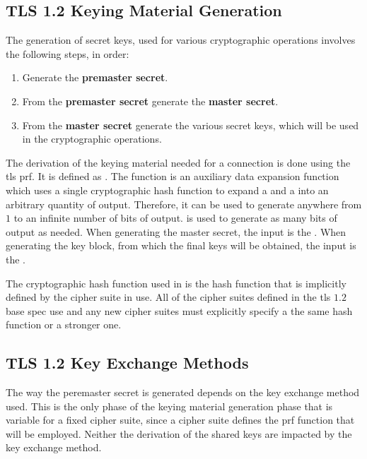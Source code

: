 \documentclass{llncs}
\begin{document}
\subsection{TLS 1.2 Keying Material Generation} \label{keying-material}

The generation of secret keys, used for various cryptographic operations involves the
following steps, in order:

\begin{enumerate}
  \item Generate the \textbf{premaster secret}.
  \item From the \textbf{premaster secret} generate the \textbf{master secret}.
  \item From the \textbf{master secret} generate the various secret keys, which
  will be used in the cryptographic operations.
\end{enumerate}

The derivation of the keying material needed for a connection is done using
the \gls{tls} \gls{prf}. It is defined as .
The  function is an auxiliary data expansion function
which uses a single cryptographic hash function to expand a  and a 
into an arbitrary quantity of output. Therefore, it can be used to generate
anywhere from $1$ to an infinite number of bits of output. 
is used to generate as many bits of output as needed. When generating the
master secret, the  input is the .
When generating the key block, from which the final keys will be obtained,
the  input is the .

The cryptographic hash function used in  is
the hash function that is implicitly defined by the cipher suite in use. All of the cipher
suites defined in the \gls{tls} $1.2$ base spec use  and any new
cipher suites must explicitly specify a the same hash function or a stronger one.

\subsection{TLS 1.2 Key Exchange Methods} \label{key-exchange}

The way the peremaster secret is generated depends on the key exchange
method used. This is the only phase of the keying material generation
phase that is variable for a fixed cipher suite, since a cipher suite defines
the \gls{prf} function that will be employed. Neither the derivation of the
shared keys are impacted by the key exchange method.
\end{document}
